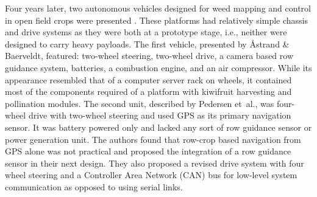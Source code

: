 \documentclass[preprint,authoryear,12pt]{elsarticle}
\begin{document}


        Four years later, two autonomous vehicles designed for weed mapping and control in open field crops were presented \citep{Pedersen2002,Astrand2002}.
        These platforms had relatively simple chassis and drive systems as they were both at a prototype stage, i.e., neither were designed to carry heavy payloads.
        The first vehicle, presented by Åstrand \& Baerveldt, featured: two-wheel steering, two-wheel drive, a camera based row guidance system, batteries, a combustion engine, and an air compressor.
        While its appearance resembled that of a computer server rack on wheels, it contained most of the components required of a platform with kiwifruit harvesting and pollination modules.
        The second unit, described by Pedersen et~al.\@, was four-wheel drive with two-wheel steering and used GPS as its primary navigation sensor.
        It was battery powered only and lacked any sort of row guidance sensor or power generation unit.
        The authors found that row-crop based navigation from GPS alone was not practical and proposed the integration of a row guidance sensor in their next design.
        They also proposed a revised drive system with four wheel steering and a Controller Area Network (CAN) bus for low-level system communication as opposed to using serial links.


\end{document}
